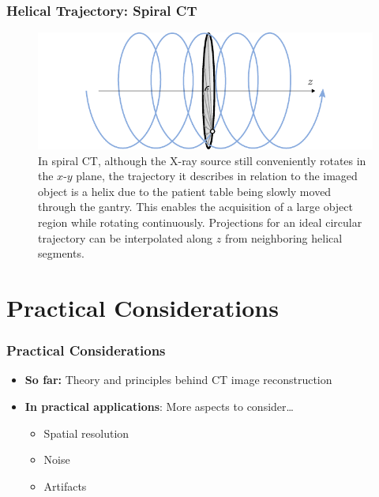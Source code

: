 \begin{frame}
	\frametitle{Helical Trajectory: Spiral CT}

	\begin{figure}[tbp]
		\centering
		\includegraphics[width=\linewidth]{images/geom_3}
		\caption{In spiral CT, although the X-ray source still conveniently rotates in the $x$-$y$ plane, the trajectory it describes in relation to the imaged object is a helix due to the patient table being slowly moved through the gantry. This enables the acquisition of a large object region while rotating continuously. Projections for an ideal circular trajectory can be interpolated along $z$ from neighboring helical segments.}
		\label{fig:ct_geom_1.3}
	\end{figure}

\end{frame}

\subtitle{Computed Tomography - Part 3}
\frame[plain,c]{\titlepage}

\section{Practical Considerations}
\label{sec:ct_considerations}

\begin{frame}
	\frametitle{Practical Considerations}

	\begin{itemize}
		\setlength\itemsep{0.5cm}
		\item \textcolor{faublue}{\textbf{So far:}} Theory and principles behind CT image reconstruction
		\item \textcolor{faublue}{\textbf{In practical applications}}: More aspects to consider\ldots
		      \begin{itemize}
			      \item Spatial resolution
			      \item Noise
			      \item Artifacts
		      \end{itemize}
	\end{itemize}

\end{frame}

